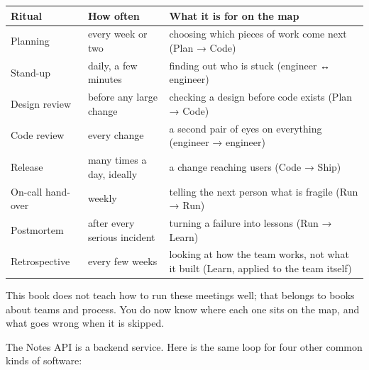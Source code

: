 {\def\LTcaptype{none} %
\begin{longtable}[]{@{}
  >{\raggedright\arraybackslash}p{}
  >{\raggedright\arraybackslash}p{}
  >{\raggedright\arraybackslash}p{}@{}}
\toprule\noalign{}
\begin{minipage}[b]{\linewidth}\raggedright
Ritual
\end{minipage} & \begin{minipage}[b]{\linewidth}\raggedright
How often
\end{minipage} & \begin{minipage}[b]{\linewidth}\raggedright
What it is for on the map
\end{minipage} \\
\midrule\noalign{}
\endhead
\bottomrule\noalign{}
\endlastfoot
Planning & every week or two & choosing which pieces of work come next (Plan → Code) \\
Stand-up & daily, a few minutes & finding out who is stuck (engineer ↔ engineer) \\
Design review & before any large change & checking a design before code exists (Plan → Code) \\
Code review & every change & a second pair of eyes on everything (engineer → engineer) \\
Release & many times a day, ideally & a change reaching users (Code → Ship) \\
On-call hand-over & weekly & telling the next person what is fragile (Run → Run) \\
Postmortem & after every serious incident & turning a failure into lessons (Run → Learn) \\
Retrospective & every few weeks & looking at how the team works, not what it built (Learn, applied to the team itself) \\
\end{longtable}
}

This book does not teach how to run these meetings well; that belongs to books about teams and process. You do now know where each one sits on the map, and what goes wrong when it is skipped.

\label{the-same-process-in-a-team:the-same-map-for-any-application}

The Notes API is a backend service. Here is the same loop for four other common kinds of software:

